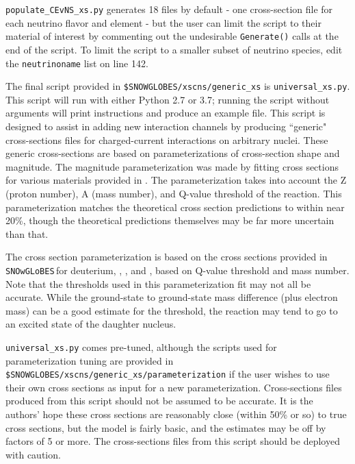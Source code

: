 \documentclass{article}
\newcommand{\snow}{\texttt{SNOwGLoBES}\,}
\begin{document}
\texttt{populate\_CEvNS\_xs.py} generates 18 files by default - one cross-section file for each neutrino flavor and element - but the user can limit the script to their material of interest by commenting out the undesirable \texttt{Generate()} calls at the end of the script. To limit the script to a smaller subset of neutrino species, edit the \texttt{neutrinoname} list on line 142.

The final script provided in \texttt{\$SNOWGLOBES/xscns/generic\_xs} is \texttt{universal\_xs.py}. This script will run with either Python 2.7 or 3.7; running the script without arguments will print instructions and produce an example file. This script is designed to assist in adding new interaction channels by producing ``generic" cross-sections files for charged-current interactions on arbitrary nuclei. These generic cross-sections are based on parameterizations of cross-section shape and magnitude. The magnitude parameterization was made by fitting cross sections for various materials provided in \cite{SajjadAthar:2005ke}. The parameterization takes into account the Z (proton number), A (mass number), and Q-value threshold of the reaction.  This parameterization matches the theoretical cross section predictions to within near 20\%, though the theoretical predictions themselves may be far more uncertain than that.

The cross section parameterization is based on the cross sections provided in \snow for deuterium, , , and , based on Q-value threshold and mass number. Note that the thresholds used in this parameterization fit may not all be accurate.
While the ground-state to ground-state mass difference (plus electron mass) can be a good estimate for the threshold, the reaction may tend to go to an excited state of the daughter nucleus.

\texttt{universal\_xs.py} comes pre-tuned, although the scripts used for parameterization tuning are provided in \texttt{\$SNOWGLOBES/xscns/generic\_xs/parameterization} if the user wishes to use their own cross sections as input for a new parameterization.  Cross-sections files produced from this script should not be assumed to be accurate.  It is the authors' hope these cross sections are reasonably close (within 50\% or so) to true cross sections, but the model is fairly basic, and the estimates may be off by factors of 5 or more. The cross-sections files from this script should be deployed with caution.

\end{document}
